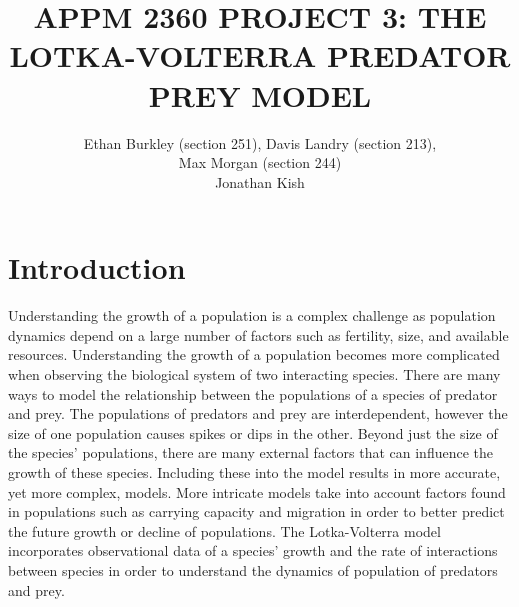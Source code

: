 \documentclass[12pt]{article}   %
\theoremstyle{definition}
\numberwithin{equation}{section}
\begin{document}
\parskip10pt
\parindent0pt
\baselineskip15pt


\title{APPM 2360 PROJECT 3: THE LOTKA-VOLTERRA PREDATOR PREY MODEL}
\author{Ethan Burkley (section 251), Davis Landry (section 213), \\Max Morgan (section 244) \\ Jonathan Kish}


\pagestyle{fancy}
\renewcommand{\sectionmark}[1]{\markright{#1}{}}

\fancyhf{}

\rhead{\fancyplain{}{\thepage}} %
\lhead{\fancyplain{}{\rightmark }} %

\maketitle

\newpage
{}
\setcounter{page}{2}

\section{Introduction} \label{APPM2360proj01sec01}
\quad Understanding the growth of a population is a complex challenge as population dynamics depend on a large number of factors such as fertility, size, and available resources. Understanding the growth of a population becomes more complicated when observing the biological system of two interacting species. There are many ways to model the relationship between the populations of a species of predator and prey. The populations of predators and prey are interdependent, however the size of one population causes spikes or dips in the other. Beyond just the size of the species' populations, there are many external factors that can influence the growth of these species. Including these into the model results in more accurate, yet more complex, models. More intricate models take into account factors found in populations such as carrying capacity and migration in order to better predict the future growth or decline of populations. The Lotka-Volterra model incorporates observational data of a species' growth and the rate of interactions between species in order to understand the dynamics of population of predators and prey. 

\setcounter{page}{1}
\end{document}
